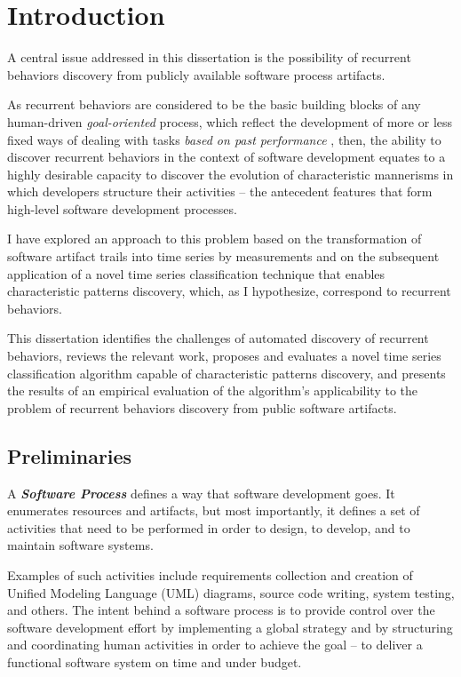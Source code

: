 \chapter{Introduction}\label{chapter_introduction}
A central issue addressed in this dissertation is the possibility of recurrent behaviors discovery 
from publicly available software process artifacts. 

As recurrent behaviors are considered to be the basic building blocks of any human-driven
\textit{goal-oriented} process, which reflect the development of more or less fixed ways of dealing 
with tasks \textit{based on past performance} \cite{neal2012habits} \cite{1903}, 
then, the ability to discover recurrent behaviors in the context of software development equates 
to a highly desirable capacity to discover the evolution of characteristic mannerisms in which developers 
structure their activities -- the antecedent features that form high-level software development processes. 

I have explored an approach to this problem based on the transformation of software artifact trails 
into time series by measurements and on the subsequent application of a novel time series 
classification technique that enables characteristic patterns discovery, which, as
I hypothesize, correspond to recurrent behaviors.

This dissertation identifies the challenges of automated discovery of recurrent behaviors, 
reviews the relevant work, proposes and evaluates a novel time series classification algorithm capable of characteristic patterns discovery, 
and presents the results of an empirical evaluation of the algorithm's applicability to the problem 
of recurrent behaviors discovery from public software artifacts.

\section{Preliminaries}\label{section_terminology}
\begin{defn}\label{def_process}
A \textbf{\textit{Software Process}} defines a way that software development goes. It enumerates
resources and artifacts, but most importantly, it defines a set of activities that need to be 
performed in order to design, to develop, and to maintain software systems.
\end{defn}
Examples of such activities include requirements collection and creation of Unified Modeling Language (UML) diagrams, 
source code writing, system testing, and others. The intent behind a software process is to provide 
control over the software development effort by implementing a global strategy and by structuring
and coordinating human activities in order to achieve the goal -- to deliver a functional
software system on time and under budget. 

